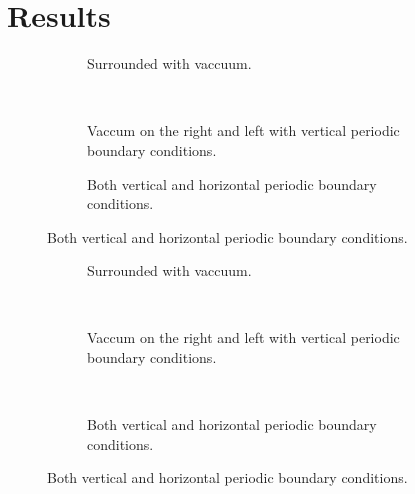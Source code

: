 \documentclass[..\main.tex]{subfile}
\begin{document}
\section{Results}
    
\begin{figure}[H]
    \centering
    \begin{subfigure}{0.3\textwidth}
        \centering
        
        \caption{Surrounded with vaccuum.}
        \label{fig:first}
    \end{subfigure}\\
    \begin{subfigure}{0.45\textwidth}
        \centering
        
        \caption{Vaccum on the right and left with vertical periodic boundary conditions.}
        \label{fig:first}
    \end{subfigure}
    \begin{subfigure}{0.45\textwidth}
        \centering
        
        \caption{Both vertical and horizontal periodic boundary conditions.}
        \label{fig:first}
    \end{subfigure}
\end{figure}

\begin{figure}[H]
    \centering
    \begin{subfigure}{0.45\textwidth}
        \centering
        

        \caption{Surrounded with vaccuum.}
        \label{fig:first}
    \end{subfigure}\\
    \begin{subfigure}{0.45\textwidth}
        \centering
        
        \caption{Vaccum on the right and left with vertical periodic boundary conditions.}
        \label{fig:first}
    \end{subfigure}\\
    \begin{subfigure}{0.45\textwidth}
        \centering
        
        \caption{Both vertical and horizontal periodic boundary conditions.}
        \label{fig:first}
    \end{subfigure}
\end{figure}
\end{document}

